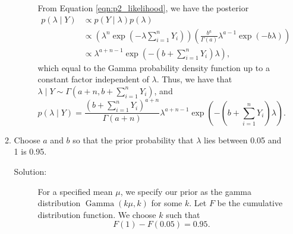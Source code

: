 \documentclass[letterpaper,11pt]{article}
\begin{document}
\begin{enumerate}
\begin{enumerate}
\begin{description}
        From Equation \ref{eqn:p2_likelihood}, we have the posterior
        \begin{align}
          p\left(\lambda \mid Y\right)
          &\propto p\left(Y\mid\lambda\right)p\left(\lambda\right) \nonumber\\
          &\propto \left(
            \lambda^n\exp\left(
            -\lambda\sum_{i=1}^nY_i
            \right)
            \right)
            \left(
            \frac{b^a}{\Gamma(a)}\lambda^{a - 1}\exp\left(-b\lambda\right)
            \right) \nonumber\\
          &\propto \lambda^{a + n - 1}\exp\left(
            -\left(b + \sum_{i=1}^nY_i\right)\lambda
            \right),
            \label{eqn:p2_posterior_propto}
        \end{align}
        which equal to the Gamma probability density function up to a constant
        factor independent of $\lambda$. Thus, we have that $\lambda \mid Y \sim
        \Gamma\left(a + n, b + \sum_{i=1}^nY_i\right)$, and
        \begin{equation}
          p\left(\lambda \mid Y \right)
          = \frac{\left(b + \sum_{i=1}^nY_i\right)^{a+n}}{\Gamma\left(a + n\right)}
          \lambda^{a + n - 1}\exp\left(-\left(b + \sum_{i=1}^nY_i\right)\lambda\right).
          \label{eqn:p2_posterior}
        \end{equation}
      \end{description}
    \item Choose $a$ and $b$ so that the prior probability that $\lambda$ lies
      between 0.05 and 1 is 0.95.
      \begin{description}
      \item[Solution:] For a specified mean $\mu$, we specify our prior as the
        gamma distribution $\operatorname{Gamma}\left(k\mu,k\right)$ for some
        $k$. Let $F$ be the cumulative distribution function. We choose $k$ such
        that
        \begin{equation}
          F\left(1\right) - F\left(0.05\right) = 0.95.
          \label{eqn:p2_hyperparameter_equation}
        \end{equation}
      \end{description}
    \end{enumerate}
  \end{enumerate}
\end{document}
